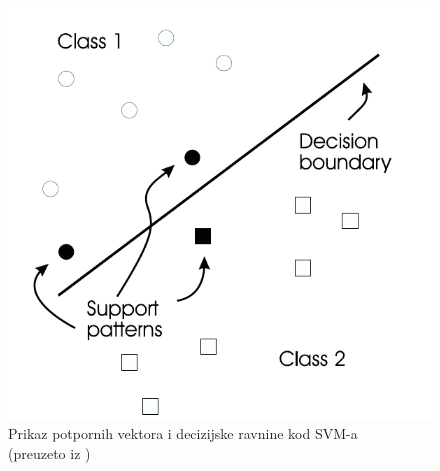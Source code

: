 \documentclass[times, utf8, diplomski]{fer}
\theoremstyle{definition}
\begin{document}
\begin{figure}[h]
\centering
\includegraphics[scale=0.5]{omc_hyperplane.png}
\caption{Prikaz potpornih vektora i decizijske ravnine kod SVM-a  \\ (preuzeto iz \cite{Lecun95learningalgorithms})}
\end{figure}
\end{document}
